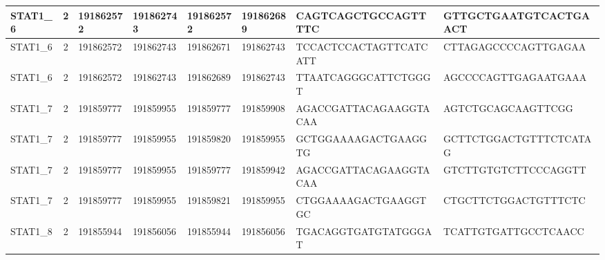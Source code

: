 \begin{landscape}
\begin{longtable}{| p{} | p{} | p{} | p{} | p{} | p{} | p{} | p{} |}
\multicolumn{1}{|l|}{STAT1\_6}   & \multicolumn{1}{c|}{2}  & \multicolumn{1}{l|}{191862572} & \multicolumn{1}{l|}{191862743} & \multicolumn{1}{l|}{191862572} & \multicolumn{1}{l|}{191862689} & \multicolumn{1}{l|}{CAGTCAGCTGCCAGTTTTC}             & \multicolumn{1}{l|}{GTTGCTGAATGTCACTGAACT}         \\ \hline
\multicolumn{1}{|l|}{STAT1\_6}   & \multicolumn{1}{c|}{2}  & \multicolumn{1}{l|}{191862572} & \multicolumn{1}{l|}{191862743} & \multicolumn{1}{l|}{191862671} & \multicolumn{1}{l|}{191862743} & \multicolumn{1}{l|}{TCCACTCCACTAGTTCATCATT}          & \multicolumn{1}{l|}{CTTAGAGCCCCAGTTGAGAA}          \\ \hline
\multicolumn{1}{|l|}{STAT1\_6}   & \multicolumn{1}{c|}{2}  & \multicolumn{1}{l|}{191862572} & \multicolumn{1}{l|}{191862743} & \multicolumn{1}{l|}{191862689} & \multicolumn{1}{l|}{191862743} & \multicolumn{1}{l|}{TTAATCAGGGCATTCTGGGT}            & \multicolumn{1}{l|}{AGCCCCAGTTGAGAATGAAA}          \\ \hline
\multicolumn{1}{|l|}{STAT1\_7}   & \multicolumn{1}{c|}{2}  & \multicolumn{1}{l|}{191859777} & \multicolumn{1}{l|}{191859955} & \multicolumn{1}{l|}{191859777} & \multicolumn{1}{l|}{191859908} & \multicolumn{1}{l|}{AGACCGATTACAGAAGGTACAA}          & \multicolumn{1}{l|}{AGTCTGCAGCAAGTTCGG}            \\ \hline
\multicolumn{1}{|l|}{STAT1\_7}   & \multicolumn{1}{c|}{2}  & \multicolumn{1}{l|}{191859777} & \multicolumn{1}{l|}{191859955} & \multicolumn{1}{l|}{191859820} & \multicolumn{1}{l|}{191859955} & \multicolumn{1}{l|}{GCTGGAAAAGACTGAAGGTG}            & \multicolumn{1}{l|}{GCTTCTGGACTGTTTCTCATAG}        \\ \hline
\multicolumn{1}{|l|}{STAT1\_7}   & \multicolumn{1}{c|}{2}  & \multicolumn{1}{l|}{191859777} & \multicolumn{1}{l|}{191859955} & \multicolumn{1}{l|}{191859777} & \multicolumn{1}{l|}{191859942} & \multicolumn{1}{l|}{AGACCGATTACAGAAGGTACAA}          & \multicolumn{1}{l|}{GTCTTGTGTCTTCCCAGGTT}          \\ \hline
\multicolumn{1}{|l|}{STAT1\_7}   & \multicolumn{1}{c|}{2}  & \multicolumn{1}{l|}{191859777} & \multicolumn{1}{l|}{191859955} & \multicolumn{1}{l|}{191859821} & \multicolumn{1}{l|}{191859955} & \multicolumn{1}{l|}{CTGGAAAAGACTGAAGGTGC}            & \multicolumn{1}{l|}{CTGCTTCTGGACTGTTTCTC}          \\ \hline
\multicolumn{1}{|l|}{STAT1\_8}   & \multicolumn{1}{c|}{2}  & \multicolumn{1}{l|}{191855944} & \multicolumn{1}{l|}{191856056} & \multicolumn{1}{l|}{191855944} & \multicolumn{1}{l|}{191856056} & \multicolumn{1}{l|}{TGACAGGTGATGTATGGGAT}            & \multicolumn{1}{l|}{TCATTGTGATTGCCTCAACC}          \\ \hline

\end{longtable}
\end{landscape}
